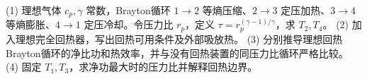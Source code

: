 (1) 理想气体 \(c_p,\gamma\) 常数，Brayton循环 \(1\to2\) 等熵压缩、\(2\to3\) 定压加热、\(3\to4\) 等熵膨胀、\(4\to1\) 定压冷却。令压力比 \(r_p\)，定义 \(\tau=r_p^{(\gamma-1)/\gamma}\)，求 \(T_2,T_4\)。
(2) 加入理想完全回热器，写出回热可用条件及外部吸放热。
(3) 分别推导理想回热Brayton循环的净比功和热效率，并与没有回热装置的同压力比循环严格比较。
(4) 固定 \(T_1,T_3\)，求净功最大时的压力比并解释回热边界。
